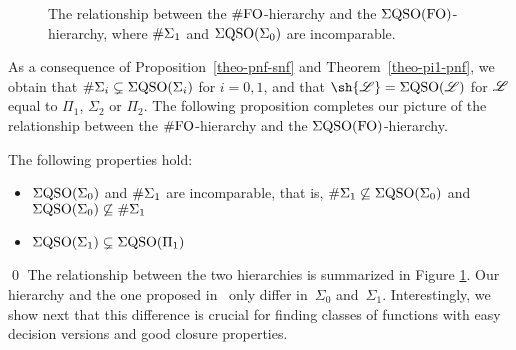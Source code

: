 \begin{figure*}
\begin{center}
\end{center}
\vspace{-0.4cm}
\caption{The relationship between the $\#{\rm FO}$-hierarchy and the $\Sigma{\rm QSO}({\rm FO})$-hierarchy, where $\#\Sigma_{1}$ and $\Sigma{\rm QSO}(\Sigma_{0})$ are incomparable. \label{fig-sfo-eqso}}
\vspace{-0.1cm}
\end{figure*}

As a consequence of Proposition~\ref{theo-pnf-snf} and Theorem~\ref{theo-pi1-pnf}, we obtain that $\#\Sigma_{i} \subsetneq \Sigma{\rm QSO}(\Sigma_{i})$ for $i = 0,1$, and that $\sh{\LL} = \eqso(\LL)$ for $\mathscr{L}$ equal to  $\Pi_1$, $\Sigma_2$ or $\Pi_2$. The following proposition completes our picture of the relationship between the $\#{\rm FO}$-hierarchy and the $\Sigma{\rm QSO}({\rm FO})$-hierarchy.
\begin{prop}\label{prop-rest}
The following properties hold:
\begin{itemize}
\item $\Sigma{\rm QSO}(\Sigma_{0})$ and $\#\Sigma_{1}$ are incomparable, that is, $\#\Sigma_{1} \not\subseteq \Sigma{\rm QSO}(\Sigma_{0})$ and $\Sigma{\rm QSO}(\Sigma_{0}) \not\subseteq \#\Sigma_{1}$
\item $\Sigma{\rm QSO}(\Sigma_{1}) \subsetneq \Sigma{\rm QSO}(\Pi_{1})$
\end{itemize}
\end{prop}
\proof

\qed
The relationship between the two hierarchies is summarized in Figure \ref{fig-sfo-eqso}.
Our hierarchy and the one proposed in~\cite{SalujaST95} only differ in~$\Sigma_0$ and~$\Sigma_1$. 
Interestingly, we show next that this difference is crucial for finding classes of functions with easy decision versions and good closure properties.